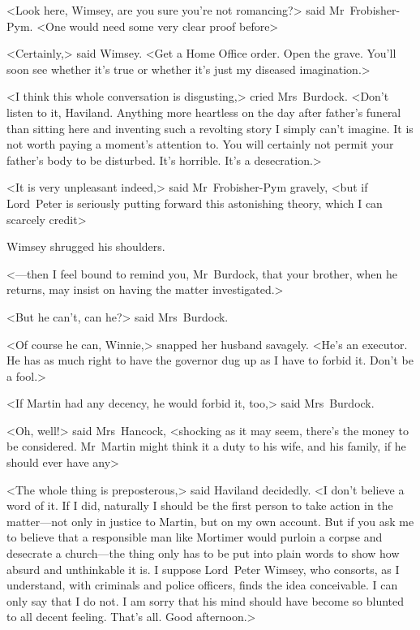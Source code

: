 <Look here, Wimsey, are you sure you're not romancing?> said Mr~Frobisher-Pym. <One would need some very clear proof before\longdash>

<Certainly,> said Wimsey. <Get a Home Office order. Open the grave. You'll soon see whether it's true or whether it's just my diseased imagination.>

<I think this whole conversation is disgusting,> cried Mrs~Burdock. <Don't listen to it, Haviland. Anything more heartless on the day after father's funeral than sitting here and inventing such a revolting story I simply can't imagine. It is not worth paying a moment's attention to. You will certainly not permit your father's body to be disturbed. It's horrible. It's a desecration.>

<It is very unpleasant indeed,> said Mr~Frobisher-Pym gravely, <but if Lord~Peter is seriously putting forward this astonishing theory, which I can scarcely credit\longdash>

Wimsey shrugged his shoulders.

<—then I feel bound to remind you, Mr~Burdock, that your brother, when he returns, may insist on having the matter investigated.>

<But he can't, can he?> said Mrs~Burdock.

<Of course he can, Winnie,> snapped her husband savagely. <He's an executor. He has as much right to have the governor dug up as I have to forbid it. Don't be a fool.>

<If Martin had any decency, he would forbid it, too,> said Mrs~Burdock.

<Oh, well!> said Mrs~Hancock, <shocking as it may seem, there's the money to be considered. Mr~Martin might think it a duty to his wife, and his family, if he should ever have any\longdash>

<The whole thing is preposterous,> said Haviland decidedly. <I don't believe a word of it. If I did, naturally I should be the first person to take action in the matter—not only in justice to Martin, but on my own account. But if you ask me to believe that a responsible man like Mortimer would purloin a corpse and desecrate a church—the thing only has to be put into plain words to show how absurd and unthinkable it is. I suppose Lord~Peter Wimsey, who consorts, as I understand, with criminals and police officers, finds the idea conceivable. I can only say that I do not. I am sorry that his mind should have become so blunted to all decent feeling. That's all. Good afternoon.>


